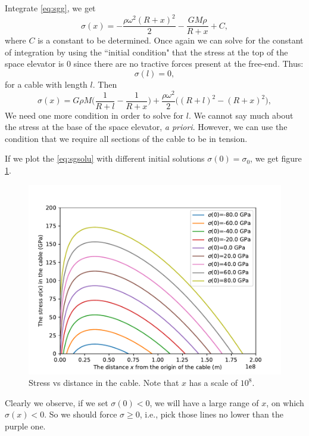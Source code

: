 \documentclass[12pt]{article}
\begin{document}
Integrate \eqref{eq:sgg}, we get
\begin{equation}
	\sigma(x) = -\frac{\rho \omega^2 (R + x)^2}{2} - \frac{ G M \rho }{ R + x } + C,
\end{equation}
where $C$ is a constant to be determined.
Once again we can solve for the constant of integration by using the ``initial condition" that the stress at the top of the space elevator is $0$ since there are no tractive forces present at the free-end. Thus:
\begin{equation}
	\sigma(l) = 0,
\end{equation}
for a cable with length $l$.
Then
\begin{equation}\label{eq:sgsolu}
	\sigma(x) = G \rho M \bigg( \frac{1}{R + l} - \frac{1}{R + x}\bigg) + \frac{ \rho \omega^2 }{ 2 } \big( (R + l)^2 - (R + x)^2 \big),
\end{equation}
We need one more condition in order to solve for $l$. We cannot say much about the stress at the base of the space elevator, \textit{a priori}. However, we can use the condition that we require all sections of the cable to be in tension.

If we plot the \eqref{eq:sgsolu} with different initial solutions $\sigma(0) = \sigma_0$, we get figure \ref{fig:stress}.
\begin{figure}[h]
	\centering
	\includegraphics[width=0.8\linewidth]{images/stress.pdf}
	\caption{Stress vs distance in the cable. Note that $x$ has a scale of $10^8$.}
	\label{fig:stress}
\end{figure}

Clearly we observe, if we set $\sigma(0) < 0$, we will have a large range of $x$, on which $\sigma(x) < 0$. So
we should force $\sigma \ge 0$, i.e., pick those lines no lower than the purple one.
\end{document}
